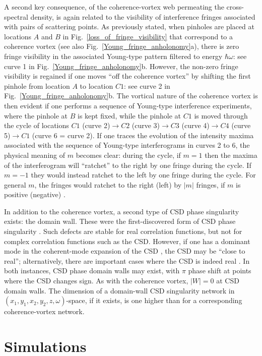\documentclass[%
 reprint,
 amsmath,amssymb,
 aps,
]{revtex4-1}
\begin{document}
A second key consequence, of the coherence-vortex web permeating the cross-spectral density, is again related to the visibility of interference fringes associated with pairs of scattering points.  As previously stated, when pinholes are placed at locations $A$ and $B$ in Fig.~\ref{loss_of_fringe_visibility} that correspond to a coherence vortex (see also Fig.~\ref{Young_fringe_anholonomy}a), there is zero fringe visibility in the associated Young-type pattern filtered to energy $\hbar \omega$: see curve 1 in Fig.~\ref{Young_fringe_anholonomy}b.  However, the non-zero fringe visibility is regained if one moves ``off the coherence vortex'' by shifting the first pinhole from location $A$ to location $C1$: see curve 2 in Fig.~\ref{Young_fringe_anholonomy}b.  The vortical nature of the coherence vortex is then evident if one performs a sequence of Young-type interference experiments, where the pinhole at $B$ is kept fixed, while the pinhole at $C1$ is moved through the cycle of locations $C1$ (curve 2)$\rightarrow C2$ (curve 3)$\rightarrow C3$ (curve 4)$\rightarrow C4$ (curve 5)$\rightarrow C1$ (curve 6 = curve 2). If one traces the evolution of the intensity maxima associated with the sequence of Young-type interferograms in curves 2 to 6, the physical meaning of $m$ becomes clear: during the cycle, if $m=1$ then the maxima of the interferogram will ``ratchet'' to the right by one fringe during the cycle. If $m=-1$ they would instead ratchet to the left by one fringe during the cycle.  For general $m$, the fringes would ratchet to the right (left) by $|m|$ fringes, if $m$ is positive (negative) \cite{Marasinghe2010}.

In addition to the coherence vortex, a second type of CSD phase singularity exists: the domain wall.  These were the first-discovered form of CSD phase singularity \cite{Schouten2003}.  Such defects are stable for real correlation functions, but not for complex correlation functions such as the CSD.  However, if one has a dominant mode in the coherent-mode expansion of the CSD \cite{mandel_wolf}, the CSD may be ``close to real''; alternatively, there are important cases where the CSD is indeed real \cite{Schouten2003}.  In both instances, CSD phase domain walls may exist, with $\pi$ phase shift at points where the CSD changes sign.  As with the coherence vortex, $|W|=0$ at CSD domain walls.  The dimension of a domain-wall CSD singularity network in $(x_1,y_1,x_2,y_2,z,\omega)$-space, if it exists, is one higher than for a corresponding coherence-vortex network.  

\section{Simulations}
\end{document}
